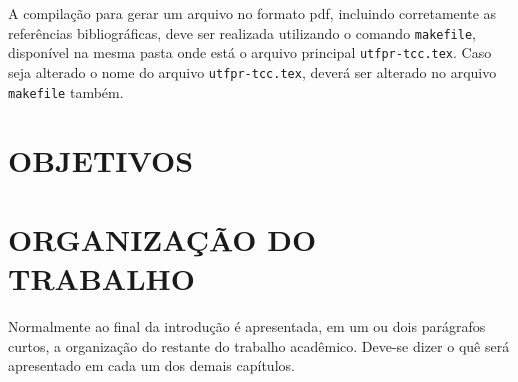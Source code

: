 A compilação para gerar um arquivo no formato pdf, incluindo corretamente as referências bibliográficas, deve ser realizada utilizando o comando \verb|makefile|, disponível na mesma pasta onde está o arquivo principal \verb|utfpr-tcc.tex|. Caso seja alterado o nome do arquivo \verb|utfpr-tcc.tex|, deverá ser alterado no arquivo \verb|makefile| também.

\section{OBJETIVOS}
\label{sec:objetivos}

\section{ORGANIZAÇÃO DO TRABALHO}
\label{sec:organizacaoTrabalho}

Normalmente ao final da introdução é apresentada, em um ou dois parágrafos curtos, a organização do restante do trabalho acadêmico.
Deve-se dizer o quê será apresentado em cada um dos demais capítulos.
